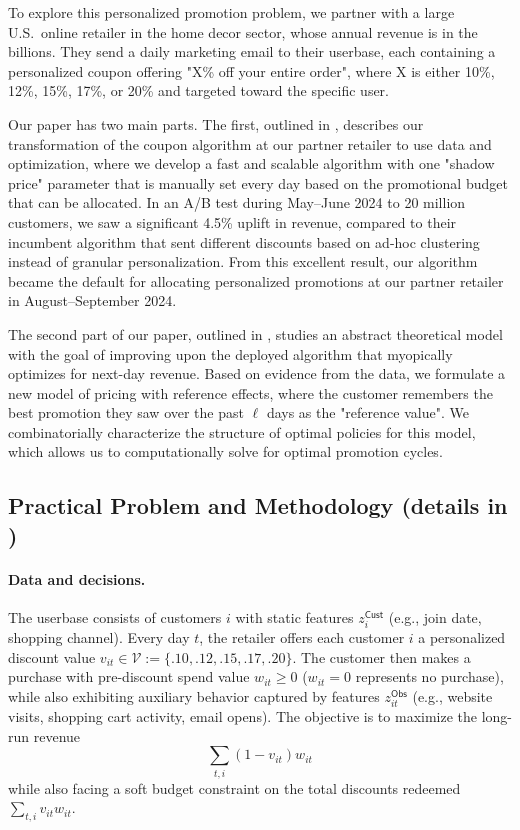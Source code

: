 \documentclass[format=acmsmall, review=false]{acmart}
\newcommand{\cV}{\mathcal{V}}
\newcommand{\zCust}{z^\mathsf{Cust}}
\newcommand{\zObs}{z^\mathsf{Obs}}
\begin{document}
To explore this personalized promotion problem,
we partner with a large U.S.\ online retailer in the home decor sector, whose annual revenue is in the billions.
They send a daily marketing email to their userbase, each containing a personalized coupon offering "X\% off your entire order", where X is either 10\%, 12\%, 15\%, 17\%, or 20\% and targeted toward the specific user.

Our paper has two main parts.
The first, outlined in , describes our transformation of the coupon algorithm at our partner retailer to use data and optimization, where we develop a fast and scalable algorithm with one "shadow price" parameter that is manually set every day based on the promotional budget that can be allocated.
In an A/B test during May--June 2024 to 20 million customers, we saw a significant 4.5\% uplift in revenue, compared to their incumbent algorithm that sent different discounts based on ad-hoc clustering instead of granular personalization.
From this excellent result,
our algorithm became the default for allocating personalized promotions at our partner retailer in August--September 2024.

The second part of our paper, outlined in , studies an abstract theoretical model with the goal of improving upon the deployed algorithm that myopically optimizes for next-day revenue.  Based on evidence from the data, we formulate a new model of pricing with reference effects, where the customer remembers the best promotion they saw over the past $\ell$ days as the "reference value".  We combinatorially characterize the structure of optimal policies for this model, which allows us to computationally solve for optimal promotion cycles.

\subsection{Practical Problem and Methodology (details in )} \label{sec:introMethod}

\paragraph{Data and decisions.}
The userbase consists of customers $i$ with static features $\zCust_i$ (e.g., join date, shopping channel).
Every day $t$, the retailer offers each customer $i$ a personalized discount value $v_{it}\in\cV:=\{.10,.12,.15,.17,.20\}$. 
The customer then makes a purchase with pre-discount spend value $w_{it}\ge 0$ ($w_{it} = 0$ represents no purchase),
while also exhibiting auxiliary behavior captured by features $\zObs_{it}$ (e.g., website visits, shopping cart activity, email opens).
The objective is to maximize the long-run revenue
$$
\sum_{t,i} (1-v_{it})w_{it}
$$
while also facing a soft budget constraint on the total discounts redeemed $\sum_{t,i} v_{it}w_{it}$.
\end{document}
